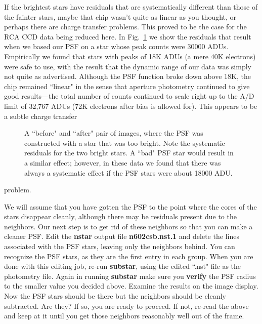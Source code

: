 If the brightest stars have residuals that are systematically different than 
those of the fainter stars, maybe that chip wasn't quite as linear as you
thought, or perhaps there are charge transfer problems.  This proved to
be the case for the RCA CCD data being reduced here.  In Fig.~\ref{yuko}
we show the residuals that result when we based our PSF on a star whose
peak counts were 30000 ADUs.  
Empirically we found that stars with peaks of 18K ADUs (a mere 40K electrons)
were safe to use, with the result that the dynamic range of our data
was simply not quite as advertised.  Although the PSF function broke down
above 18K, the chip remained ``linear" in the sense that aperture photometry
continued to give good results---the total number of counts continued to
scale right up to the A/D limit of 32,767 ADUs (72K electrons after bias
is allowed for).   This appears to be a subtle charge transfer
\begin{figure}
\vspace{7.0in}
\caption{\label{yuko} A ``before" and ``after" pair of images, where the
PSF was constructed with a star that was too bright.  Note the systematic
residuals for the two bright stars.  A ``bad" PSF star would result in a
similar effect; however, in these data we found that there was always a
systematic effect if the PSF stars were about 18000 ADU.}
\end{figure}
problem.
 
We will assume that you have gotten the PSF to the point where
the cores of the stars disappear cleanly, although there may be residuals
present due to the neighbors.  Our next step is to get rid of these neighbors
so that you can make a cleaner PSF.  Edit the {\bf nstar} output file
{\bf n602csb.nst.1} and delete the lines associated with the PSF stars,
leaving only the neighbors behind.  You can recognize the PSF stars, as
they are the first entry in each group.  When you are done with this
editing job, re-run {\bf substar}, using the edited ``.nst" file as the
photometry file.  Again in running {\bf substar} make sure you {\bf verify}
the PSF radius to the smaller value you decided above.  Examine the results
on the image display.  Now the PSF stars should be there but the neighbors
should be cleanly subtracted.  Are they?  If so, you are ready to proceed.
If not, re-read the above and keep at it until you get those neighbors
reasonably well out of the frame.
 

